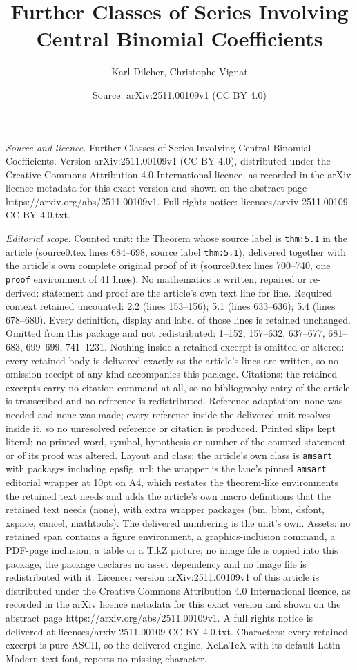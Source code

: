 \documentclass[10pt,a4paper]{amsart}
\title[Further Classes of Series Involving Central Binomial Coeffic]{Further Classes of Series Involving Central Binomial Coefficients}
\author{Karl Dilcher, Christophe Vignat}
\date{Source: arXiv:2511.00109v1 (CC BY 4.0)}
\begin{document}
\maketitle

\noindent\emph{Source and licence.} Further Classes of Series Involving Central Binomial Coefficients. Version arXiv:2511.00109v1 (CC BY 4.0), distributed under the Creative Commons Attribution 4.0 International licence, as recorded in the arXiv licence metadata for this exact version and shown on the abstract page https://arxiv.org/abs/2511.00109v1. Full rights notice: licenses/arxiv-2511.00109-CC-BY-4.0.txt.\par\smallskip

\noindent\textit{Editorial scope.} Counted unit: the Theorem whose source label is \texttt{thm:5.1} in the article (source0.tex lines 684--698, source label \texttt{thm:5.1}), delivered together with the article's own complete original proof of it (source0.tex lines 700--740, one \texttt{proof} environment of 41 lines). No mathematics is written, repaired or re-derived: statement and proof are the article's own text line for line. Required context retained uncounted: 2.2 (lines 153--156); 5.1 (lines 633--636); 5.4 (lines 678--680). Every definition, display and label of those lines is retained unchanged. Omitted from this package and not redistributed: 1--152, 157--632, 637--677, 681--683, 699--699, 741--1231. Nothing inside a retained excerpt is omitted or altered: every retained body is delivered exactly as the article's lines are written, so no omission receipt of any kind accompanies this package. Citations: the retained excerpts carry no citation command at all, so no bibliography entry of the article is transcribed and no reference is redistributed. Reference adaptation: none was needed and none was made; every reference inside the delivered unit resolves inside it, so no unresolved reference or citation is produced. Printed slips kept literal: no printed word, symbol, hypothesis or number of the counted statement or of its proof was altered. Layout and class: the article's own class is \texttt{amsart} with packages including epsfig, url; the wrapper is the lane's pinned \texttt{amsart} editorial wrapper at 10pt on A4, which restates the theorem-like environments the retained text needs and adds the article's own macro definitions that the retained text needs (none), with extra wrapper packages (bm, bbm, dsfont, xspace, cancel, mathtools). The delivered numbering is the unit's own. Assets: no retained span contains a figure environment, a graphics-inclusion command, a PDF-page inclusion, a table or a TikZ picture; no image file is copied into this package, the package declares no asset dependency and no image file is redistributed with it. Licence: version arXiv:2511.00109v1 of this article is distributed under the Creative Commons Attribution 4.0 International licence, as recorded in the arXiv licence metadata for this exact version and shown on the abstract page https://arxiv.org/abs/2511.00109v1. A full rights notice is delivered at licenses/arxiv-2511.00109-CC-BY-4.0.txt. Characters: every retained excerpt is pure ASCII, so the delivered engine, XeLaTeX with its default Latin Modern text font, reports no missing character.
\end{document}
